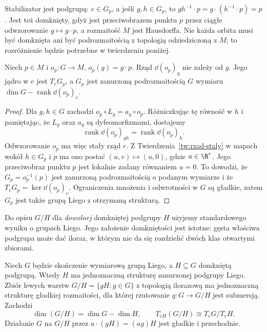 Stabilizator jest podgrupą: $e\in G_p$, a jeśli $g,h\in G_p$, to
$gh^{-1}\cdot p=g\cdot(h^{-1}\cdot p)=p$. Jest też domknięty,
gdyż jest przeciwobrazem punktu $p$ przez ciągłe odwzorowanie
$g\mapsto g\cdot p$, a rozmaitość $M$ jest Hausdorffa. Nie każda
orbita musi być domknięta ani być podrozmaitością z topologią
odziedziczoną z $M$; to rozróżnienie będzie potrzebne w twierdzeniu
poniżej.

\begin{lemat}
\label{lem:klein-rzad-orbity}
Niech $p\in M$ i $o_p:G\to M$, $o_p(g)=g\cdot p$. Rząd
$\dd(o_p)_g$ nie zależy od $g$. Jego jądro w $e$ jest
$T_eG_p$, a $G_p$ jest zanurzoną podrozmaitością $G$ wymiaru
$\dim G-\operatorname{rank}\dd(o_p)_e$.
\end{lemat}
\begin{proof}
Dla $g,h\in G$ zachodzi $o_p\circ L_g=a_g\circ o_p$.
Różniczkując tę równość w $h$ i pamiętając, że $L_g$ oraz
$a_g$ są dyfeomorfizmami, dostajemy
\[
 \operatorname{rank}\dd(o_p)_{gh}
 =\operatorname{rank}\dd(o_p)_h.
\]
Odwzorowanie $o_p$ ma więc stały rząd $r$. Z
Twierdzenia~\ref{tw:rzad-staly} w mapach wokół $h\in G_p$ i $p$
ma ono postać $(u,v)\mapsto(u,0)$, gdzie $u\in\R^r$.
Jego przeciwobraz punktu $p$ jest lokalnie zadany równaniem $u=0$.
To dowodzi, że $G_p=o_p^{-1}(p)$ jest zanurzoną podrozmaitością
o podanym wymiarze i że $T_eG_p=\ker\dd(o_p)_e$.
Ograniczenia mnożenia i odwrotności w $G$ są gładkie, zatem
$G_p$ jest także grupą Liego z otrzymaną strukturą.
\end{proof}

Do opisu $G/H$ dla \emph{dowolnej} domkniętej podgrupy $H$ użyjemy
standardowego wyniku o grupach Liego. Jego założenie domkniętości
jest istotne: gęsta właściwa podgrupa może dać iloraz, w którym
nie da się rozdzielić dwóch klas otwartymi zbiorami.

\begin{twierdzenie}
\label{thm:klein-iloraz-liego}
Niech $G$ będzie skończenie wymiarową grupą Liego, a $H\subseteq G$
domkniętą podgrupą. Wtedy $H$ ma jednoznaczną strukturę zanurzonej
podgrupy Liego. Zbiór lewych warstw $G/H=\{gH:g\in G\}$ z topologią
ilorazową ma jednoznaczną strukturę gładkiej rozmaitości, dla której
rzutowanie $q:G\to G/H$ jest submersją. Zachodzi
\[
 \dim(G/H)=\dim G-\dim H,\qquad
 T_{eH}(G/H)\cong T_eG/T_eH.
\]
Działanie $G$ na $G/H$ przez $a\cdot(gH)=(ag)H$ jest gładkie
i przechodnie.
\end{twierdzenie}

